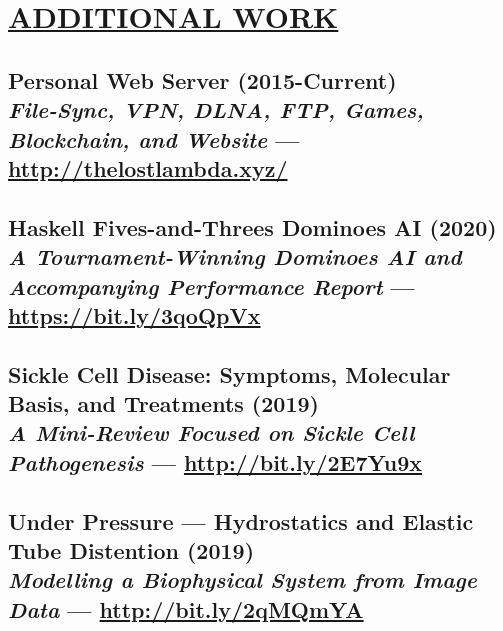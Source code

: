 \documentclass[twocolumn, a4paper, fontsize=9pt, headsepline, footsepline]{scrartcl}
\begin{document}
\onecolumn
{}
\section*{\ul{ADDITIONAL WORK}}

\subsection*{Personal Web Server (2015-Current)\\\textmd{\emph{File-Sync, VPN,
    DLNA, FTP, Games, Blockchain, and Website} — \url{http://thelostlambda.xyz/}}}

\subsection*{Haskell Fives-and-Threes Dominoes AI (2020)\\\textmd{\emph{A
    Tournament-Winning Dominoes AI and Accompanying Performance Report} —
    \url{https://bit.ly/3qoQpVx}}}

\subsection*{Sickle Cell Disease: Symptoms, Molecular Basis, and Treatments
(2019)\\\textmd{\emph{A Mini-Review Focused on Sickle Cell Pathogenesis} — \url{http://bit.ly/2E7Yu9x}}}


\subsection*{Under Pressure — Hydrostatics and Elastic Tube Distention
  (2019)\\\textmd{\emph{Modelling a Biophysical System from Image Data} — \url{http://bit.ly/2qMQmYA}}}

\end{document}
